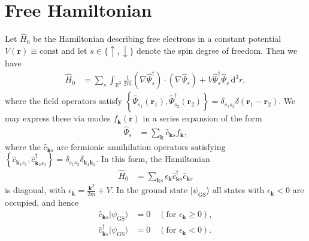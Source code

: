 \documentclass[english, parskip=full]{scrartcl}
\title{\titel}
\author{\autor}
\date{\today}
\newcommand{\intr}{}
\newcommand{\kla}{}
\newcommand{\klammer}{}
\newcommand{\tecxt}{}
\newcommand{\Ket}{}
\begin{document}
\maketitle  %

\section{Free Hamiltonian}
Let $\hat{H}_0$ be the Hamiltonian describing free electrons in a constant potential $V(\mathbf{r}) \equiv \tecxt\text{const}$ and let $s\in\{\uparrow,\downarrow\}$ denote the spin degree of freedom.
Then we have
\begin{align}
\hat{H}_0 &= \sum_s \intr\int_{\mathbb{R}^{3}} \frac{1}{2m} \kla\left( \nabla \hat{\Psi}_s^\dagger \right)\cdot \kla\left( \nabla \hat{\Psi}_s \right) + V\hat{\Psi}_s^\dagger \hat{\Psi}_s \, \mathrm{d}^{3}r,
\end{align}
where the field operators satisfy $\klammer\left\{ \hat{\Psi}_{s_1}(\mathbf{r}_1), \hat{\Psi}_{s_2}^\dagger (\mathbf{r}_2) \right\} = \delta_{s_1s_2} \delta (\mathbf{r}_1 - \mathbf{r}_2)$.
We may express these via modes $f_{\mathbf{k}}(\mathbf{r})$ in a series expansion of the form
\begin{align}
\hat{\Psi}_s &= \sum_{\mathbf{k}} \hat{c}_{\mathbf{k}s} f_{\mathbf{k}},
\end{align}
where the $\hat{c}_{\mathbf{k}s}$ are fermionic annihilation operators satisfying $\klammer\left\{ \hat{c}_{\mathbf{k}_1s_1}, \hat{c}_{\mathbf{k}_2s_2}^\dagger \right\} = \delta_{s_1s_2}\delta_{\mathbf{k}_1\mathbf{k}_2}$.
In this form, the Hamiltonian
\begin{align}
\hat{H}_0 &= \sum_{\mathbf{k}s} \epsilon_{\mathbf{k}} \hat{c}_{\mathbf{k}s}^\dagger \hat{c}_{\mathbf{k}s}
\end{align}
is diagonal, with $\epsilon_{\mathbf{k}} = \frac{\mathbf{k}^2}{2m} + V$.
In the ground state $\Ket | \psi_\tecxt\text{GS} \rangle$ all states with $\epsilon_{\mathbf{k}} < 0$ are occupied, and hence
\begin{align}
\hat{c}_{\mathbf{k}s}\Ket | \psi_\tecxt\text{GS} \rangle &= 0 \quad (\tecxt\text{for } \epsilon_{\mathbf{k}} \ge 0),\\
\hat{c}_{\mathbf{k}s}^\dagger\Ket | \psi_\tecxt\text{GS} \rangle &= 0 \quad (\tecxt\text{for } \epsilon_{\mathbf{k}} < 0) .
\end{align}
\end{document}
